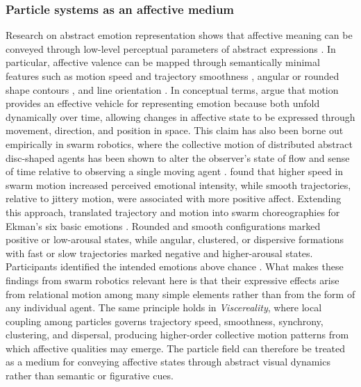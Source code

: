 \subsubsection{Particle systems as an affective medium}
Research on abstract emotion representation shows that affective meaning can be conveyed through low-level perceptual parameters of abstract expressions \citep{deRooij2013}. In particular, affective valence can be mapped through semantically minimal features such as motion speed and trajectory smoothness \citep{Bartram2010, Pollick2001, Burger2020}, angular or rounded shape contours \citep{Blazhenkova2018, Aronoff2006}, and line orientation \citep{Damiano2023}. In conceptual terms, \citet{Khatin-Zadeh2019} argue that motion provides an effective vehicle for representing emotion because both unfold dynamically over time, allowing changes in affective state to be expressed through movement, direction, and position in space. This claim has also been borne out empirically in swarm robotics, where the collective motion of distributed abstract disc-shaped agents has been shown to alter the observer’s state of flow and sense of time relative to observing a single moving agent \citep{Kaduk2024}. \citet{Dietz2017} found that higher speed in swarm motion increased perceived emotional intensity, while smooth trajectories, relative to jittery motion, were associated with more positive affect. Extending this approach, \citet{Santos2021} translated trajectory and motion into swarm choreographies for Ekman’s six basic emotions \citep{ekman1993facial}. Rounded and smooth configurations marked positive or low-arousal states, while angular, clustered, or dispersive formations with fast or slow trajectories marked negative and higher-arousal states. Participants identified the intended emotions above chance \citep{Santos2021}. What makes these findings from swarm robotics relevant here is that their expressive effects arise from relational motion among many simple elements rather than from the form of any individual agent. The same principle holds in \textit{Viscereality}, where local coupling among particles governs trajectory speed, smoothness, synchrony, clustering, and dispersal, producing higher-order collective motion patterns from which affective qualities may emerge. The particle field can therefore be treated as a medium for conveying affective states through abstract visual dynamics rather than semantic or figurative cues.



